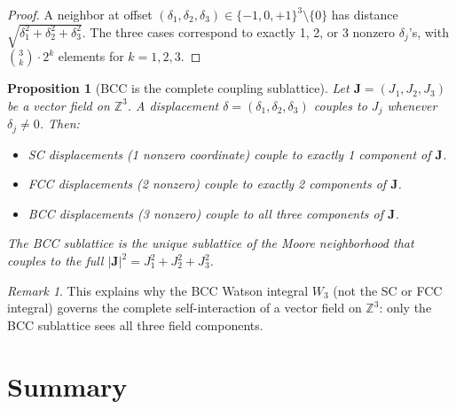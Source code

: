 \documentclass[12pt]{article}
\newtheorem{proposition}[theorem]{Proposition}
\theoremstyle{definition}
\theoremstyle{remark}
\newtheorem{remark}[theorem]{Remark}
\begin{document}
\begin{proof}
A neighbor at offset $(\delta_1, \delta_2, \delta_3) \in \{-1, 0, +1\}^3 \setminus \{0\}$ has distance $\sqrt{\delta_1^2 + \delta_2^2 + \delta_3^2}$. The three cases correspond to exactly 1, 2, or 3 nonzero $\delta_j$'s, with $\binom{3}{k}\cdot 2^k$ elements for $k = 1, 2, 3$.
\end{proof}

\begin{proposition}[BCC is the complete coupling sublattice]
\label{prop:bcc-complete}
Let $\mathbf{J} = (J_1, J_2, J_3)$ be a vector field on $\mathbb{Z}^3$. A displacement $\delta = (\delta_1, \delta_2, \delta_3)$ couples to $J_j$ whenever $\delta_j \neq 0$. Then:
\begin{itemize}[nosep]
    \item SC displacements (1 nonzero coordinate) couple to exactly 1 component of $\mathbf{J}$.
    \item FCC displacements (2 nonzero) couple to exactly 2 components of $\mathbf{J}$.
    \item BCC displacements (3 nonzero) couple to \emph{all three} components of $\mathbf{J}$.
\end{itemize}
The BCC sublattice is the unique sublattice of the Moore neighborhood that couples to the full $|\mathbf{J}|^2 = J_1^2 + J_2^2 + J_3^2$.
\end{proposition}

\begin{remark}
This explains why the BCC Watson integral $W_3$ (not the SC or FCC integral) governs the complete self-interaction of a vector field on $\mathbb{Z}^3$: only the BCC sublattice sees all three field components.
\end{remark}

\section{Summary}
\end{document}
